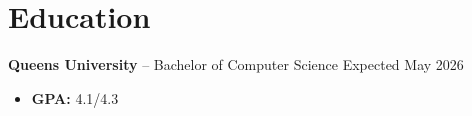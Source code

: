 

\section*{Education}
\textbf{Queen\textquotesingle s University} -- Bachelor of Computer Science \hfill Expected May 2026 \\
\vspace{-9pt}
\begin{itemize}
  \item \textbf{GPA:} 4.1/4.3
\end{itemize}

